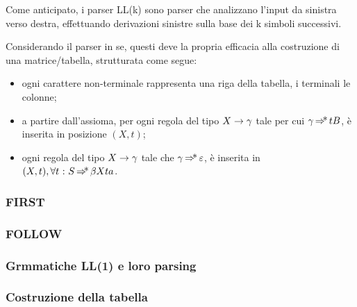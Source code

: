 \documentclass{subfiles}
\begin{document}
Come anticipato, i parser LL(k) sono parser che analizzano l'input da sinistra verso destra,
effettuando derivazioni sinistre sulla base dei k simboli successivi.

Considerando il parser in se, questi deve la propria efficacia alla costruzione di una matrice/tabella, strutturata come segue:
\begin{itemize}
    \item ogni carattere non-terminale rappresenta una riga della tabella, i terminali le colonne;
    \item a partire dall'assioma, per ogni regola del tipo $\Grammar{X}{\gamma}$ tale per cui $\gamma \operatorname{\Rightarrow\hspace{-5pt}*} tB$,
          è inserita in posizione $(X, t)$;

    \item ogni regola del tipo $\Grammar{X}{\gamma}$ tale che $\gamma \operatorname{\Rightarrow\hspace{-5pt}*} \varepsilon$,
          è inserita in $(X, t), \forall t \operatorname{\, : \,} S \operatorname{\Rightarrow\hspace{-5pt}*} \beta X t a$.
\end{itemize}

\subsubsection{FIRST}


\subsubsection{FOLLOW}

\clearpage
\subsubsection{Grmmatiche LL(1) e loro parsing}


\subsubsection{Costruzione della tabella}

\clearpage
\end{document}

